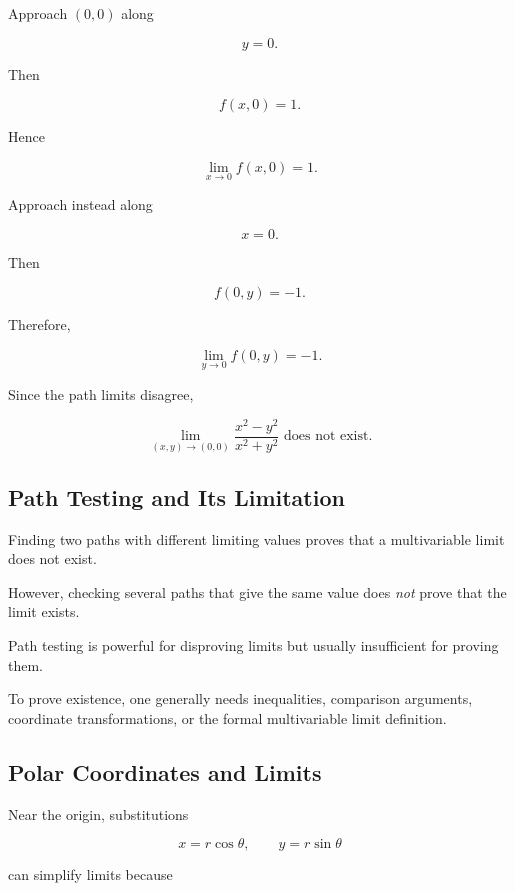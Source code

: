 Approach \((0,0)\) along

\[ y=0. \]

Then

\[ f(x,0)=1. \]

Hence

\[ \lim_{x\to0}f(x,0)=1. \]

Approach instead along

\[ x=0. \]

Then

\[ f(0,y)=-1. \]

Therefore,

\[ \lim_{y\to0}f(0,y)=-1. \]

Since the path limits disagree,

\[ \boxed{\lim_{(x,y)\to(0,0)}
\frac{x^2-y^2}{x^2+y^2}\text{ does not exist}.} \]

\subsection{Path Testing and Its Limitation}
\label{subsec:path-testing-limitation}

Finding two paths with different limiting values proves that a multivariable
limit does not exist.

However, checking several paths that give the same value does \emph{not}
prove that the limit exists.

\begin{warningbox}
Path testing is powerful for disproving limits but usually insufficient for
proving them.
\end{warningbox}

To prove existence, one generally needs inequalities, comparison arguments,
coordinate transformations, or the formal multivariable limit definition.

\subsection{Polar Coordinates and Limits}
\label{subsec:polar-limits}

Near the origin, substitutions

\[ x=r\cos\theta,\qquad y=r\sin\theta \]

can simplify limits because

